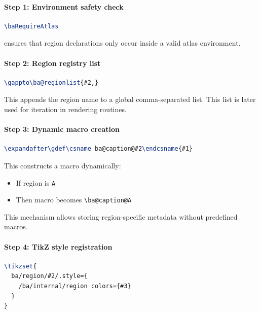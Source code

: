 \paragraph{Step 1: Environment safety check}

\begin{lstlisting}[language=LaTeX]
\baRequireAtlas
\end{lstlisting}

ensures that region declarations only occur inside a valid atlas environment.



\paragraph{Step 2: Region registry list}

\begin{lstlisting}[language=LaTeX]
\gappto\ba@regionlist{#2,}
\end{lstlisting}

This appends the region name to a global comma-separated list. This list is later used for iteration in rendering routines.

\paragraph{Step 3: Dynamic macro creation}

\begin{lstlisting}[language=LaTeX]
\expandafter\gdef\csname ba@caption@#2\endcsname{#1}
\end{lstlisting}

This constructs a macro dynamically:

\begin{itemize}
\item If region is \texttt{A}
\item Then macro becomes \texttt{\textbackslash ba@caption@A}
\end{itemize}

This mechanism allows storing region-specific metadata without predefined macros.



\paragraph{Step 4: TikZ style registration}

\begin{lstlisting}[language=LaTeX]
\tikzset{
  ba/region/#2/.style={
    /ba/internal/region colors={#3}
  }
}
\end{lstlisting}

